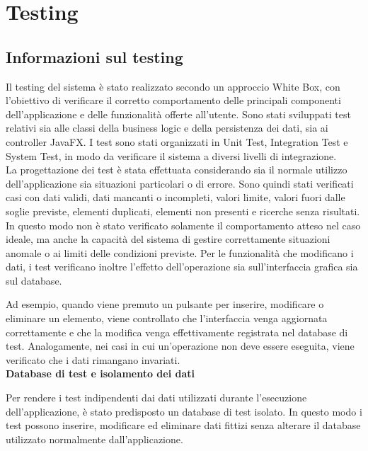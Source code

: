 \section{Testing}

\subsection{Informazioni sul testing}

Il testing del sistema è stato realizzato secondo un approccio White Box, con l'obiettivo di verificare il corretto comportamento delle principali componenti dell'applicazione e delle funzionalità offerte all'utente. Sono stati sviluppati test relativi sia alle classi della business logic e della persistenza dei dati, sia ai controller JavaFX. I test sono stati organizzati in Unit Test, Integration Test e System Test, in modo da verificare il sistema a diversi livelli di integrazione.\\

La progettazione dei test è stata effettuata considerando sia il normale utilizzo dell'applicazione sia situazioni particolari o di errore. Sono quindi stati verificati casi con dati validi, dati mancanti o incompleti, valori limite, valori fuori dalle soglie previste, elementi duplicati, elementi non presenti e ricerche senza risultati. In questo modo non è stato verificato solamente il comportamento atteso nel caso ideale, ma anche la capacità del sistema di gestire correttamente situazioni anomale o ai limiti delle condizioni previste. Per le funzionalità che modificano i dati, i test verificano inoltre l'effetto dell'operazione sia sull'interfaccia grafica sia sul database. 

Ad esempio, quando viene premuto un pulsante per inserire, modificare o eliminare un elemento, viene controllato che l'interfaccia venga aggiornata correttamente e che la modifica venga effettivamente registrata nel database di test. Analogamente, nei casi in cui un'operazione non deve essere eseguita, viene verificato che i dati rimangano invariati.\\

\textbf{Database di test e isolamento dei dati}

Per rendere i test indipendenti dai dati utilizzati durante l'esecuzione dell'applicazione, è stato predisposto un database di test isolato. In questo modo i test possono inserire, modificare ed eliminare dati fittizi senza alterare il database utilizzato normalmente dall'applicazione.

